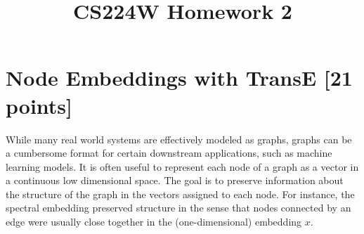 \documentclass[11pt]{article}
\title{CS224W Homework 2}
\numberwithin{figure}{section}
\begin{document}
\maketitle

\section{Node Embeddings with TransE [21 points]}

While many real world systems are effectively modeled as graphs, graphs can be a cumbersome format for certain downstream applications, such as machine learning models. It is often useful to represent each node of a graph as a vector in a continuous low dimensional space. The goal is to preserve information about the structure of the graph in the vectors assigned to each node. For instance, the spectral embedding preserved structure in the sense that nodes connected by an edge were usually close together in the (one-dimensional) embedding $x$.\\
\end{document}

